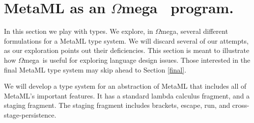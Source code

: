 \documentclass{sigplanconf}
\newcommand{\om}{$\Omega$mega}
\begin{document}
\section{MetaML as an \om~ program.} \label{lang}

In this section we play with types. We explore, in \om, several
different formulations for a MetaML type system.
We will discard several of our attempts, as our exploration 
points out their deficiencies. This section is meant
to illustrate how \om\ is useful
for exploring language design issues. Those interested in
the final MetaML type system may skip ahead to Section \ref{final}.

We will develop a type system for an abstraction of MetaML that
includes all of MetaML's important features. It has a standard lambda
calculus fragment, and a staging fragment. The staging fragment
includes brackets, escape, run, and cross-stage-persistence.
\end{document}
